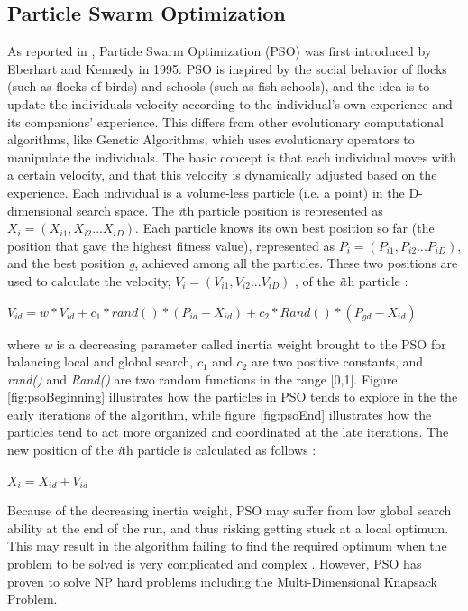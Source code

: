 \subsection{Particle Swarm Optimization}
\label{subsec:pso}
As reported in \citet{shi99}, Particle Swarm Optimization (PSO) was first introduced by Eberhart and Kennedy in 1995. PSO is inspired by the social behavior of flocks (such as flocks of birds) and schools (such as fish schools), and the idea is to update the individuals velocity according to the individual's own experience and its companions' experience. This differs from other evolutionary computational algorithms, like Genetic Algorithms, which uses evolutionary operators to manipulate the individuals. The basic concept is that each individual moves with a certain velocity, and that this velocity is dynamically adjusted based on the experience. Each individual is a volume-less particle (i.e. a point) in the D-dimensional search space. The \textit{i}th particle position is represented as $X_i = (X_{i1},X_{i2}...X_{iD})$. Each particle knows its own best position so far (the position that gave the highest fitness value), represented as $P_i = (P_{i1},P_{i2}...P_{iD})$, and the best position \textit{g}, achieved among all the particles. These two positions are used to calculate the velocity, $V_i = (V_{i1},V_{i2}...V_{iD})$ ,  of the \textit{i}th particle \citep{shi99}: 
\newline
\newline
\centerline{$V_{id} = w * V_{id} + c_1 * rand() * (P_{id}-X_{id}) + c_2 * Rand() * (P_{gd}-X_{id})$}
\newline
\newline
where \textit{w} is a decreasing parameter called inertia weight brought to the PSO for balancing local and global search, $c_1$ and $c_2$ are two positive constants, and \textit{rand()} and \textit{Rand()} are two random functions in the range [0,1]. Figure \ref{fig:psoBeginning} illustrates how the particles in PSO tends to explore in the the early iterations of the algorithm, while figure \ref{fig:psoEnd} illustrates how the particles tend to act more organized and coordinated at the late iterations. The new position of the \textit{i}th particle is calculated as follows \citep{shi99}:
\newline
\newline
\centerline{$X_i = X_{id} + V_{id}$}
\newline
\newline
Because of the decreasing inertia weight, PSO may suffer from low global search ability at the end of the run, and thus risking getting stuck at a local optimum. This may result in the algorithm failing to find the required optimum when the problem to be solved is very complicated and complex \citep{shi99}. However, PSO has proven to solve NP hard problems including the Multi-Dimensional Knapsack Problem\citep{wan09}. 

